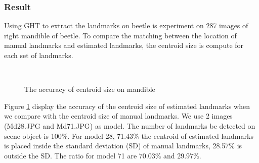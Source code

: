 \subsubsection{Result}
Using GHT to extract the landmarks on beetle is experiment on 287 images of right mandible of beetle. To compare the matching between the location of manual landmarks and estimated landmarks, the centroid size is compute for each set of landmarks.\\[0.2cm]
\begin{figure}[h!]
\centering
{}~~
\caption{The accuracy of centroid size on mandible}
\label{figcentroidSize}
\end{figure}
Figure \ref{figcentroidSize} display the accuracy of the centroid size of estimated landmarks when we compare with the centroid size of manual landmarks. We use 2 images (Md28.JPG and Md71.JPG) as model. The number of landmarks be detected on scene object is 100\%. For model 28, 71.43\% the centroid of estimated landmarks is placed inside the standard deviation (SD) of manual landmarks, 28.57\% is outside the SD. The ratio for model 71 are 70.03\% and 29.97\%.
